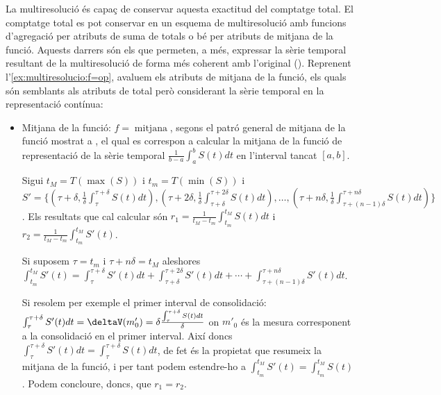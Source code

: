 La multiresolució és capaç de conservar aquesta exactitud del
comptatge total.  El comptatge total es pot conservar en un esquema de
multiresolució amb funcions d'agregació per atributs de suma de totals
o bé per atributs de mitjana de la funció. Aquests darrers són els que
permeten, a més, expressar la sèrie temporal resultant de la
multiresolució de forma més coherent amb l'original
(). Reprenent
l'\autoref{ex:multiresolucio:f=op}, avaluem els atributs de mitjana de
la funció, els quals són semblants als atributs de total però
considerant la sèrie temporal en la representació contínua:
  
  \begin{itemize}


  \item Mitjana de la funció: $f=\operatorname{mitjana}$, segons el
    patró general de mitjana de la funció mostrat a
    , el qual es correspon a calcular
    la mitjana de la funció de representació de la sèrie temporal
    $\frac{1}{b-a} \int_{a}^{b} S(t)dt$ en l'interval tancat $[a,b]$.

    Sigui $t_M=T(\max(S))$ i $t_m=T(\min(S))$ i $S'= \{
    (\tau+\delta, \frac{1}{\delta}
    \int_{\tau}^{\tau+\delta} S(t) dt), (\tau+2\delta,
     \frac{1}{\delta}\int_{\tau+\delta}^{\tau+2\delta} S(t) dt), \dotsc,
    (\tau+n\delta, \frac{1}{\delta}
    \int_{\tau+(n-1)\delta}^{\tau+n\delta} S(t) dt )\}$. %
    Els resultats que cal
    calcular són $r_1=\frac{1}{t_M-t_m} \int_{t_m}^{t_M} S(t)dt$ i
    $r_2 = \frac{1}{t_M-t_m} \int_{t_m}^{t_M} S'(t)$.

    Si suposem $\tau=t_m$ i $\tau+n\delta=t_M$ aleshores
    $\int_{t_m}^{t_M} S'(t) = \int_{\tau}^{\tau+\delta} S'(t) dt + \int_{\tau+\delta}^{\tau+2\delta} S'(t) dt + \dotsb + \int_{\tau+(n-1)\delta}^{\tau+n\delta}
    S'(t) dt$.  
    
    Si resolem per exemple el primer interval de consolidació: $
    \int_{\tau}^{\tau+\delta} S'(t) dt = \deltaV(m'_0) =
    \delta \frac{ \int_{\tau}^{\tau+\delta} S(t)
      dt}{\delta}$ on $m'_0$ és la mesura corresponent a la
    consolidació en el primer interval. Així doncs
    $\int_{\tau}^{\tau+\delta} S'(t) dt =
    \int_{\tau}^{\tau+\delta} S(t) dt$, de fet és la propietat
    que resumeix la mitjana de la funció, i per tant podem estendre-ho
    a $\int_{t_m}^{t_M} S'(t)= \int_{t_m}^{t_M} S(t)$. Podem
    concloure, doncs, que $r_1=r_2$.



\end{itemize}
